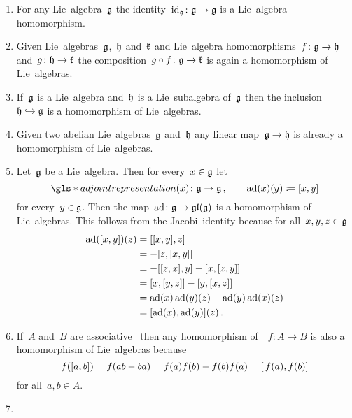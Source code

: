 \begin{examples}
  \label{homomorphisms of lie algebras}
  \leavevmode
  \begin{enumerate}
    \item
      For any Lie~algebra~$\mathfrak{g}$ the identity~$\operatorname{id}_{\mathfrak{g}} \colon \mathfrak{g} \to \mathfrak{g}$ is a Lie~algebra homomorphism.
    \item
      Given Lie~algebras~$\mathfrak{g}$,~$\mathfrak{h}$ and~$\mathfrak{k}$ and Lie~algebra homomorphisms~$f \colon \mathfrak{g} \to \mathfrak{h}$ and~$g \colon \mathfrak{h} \to \mathfrak{k}$ the composition~$g \circ f \colon \mathfrak{g} \to \mathfrak{k}$ is again a homomorphism of Lie~algebras.
    \item
      If~$\mathfrak{g}$ is a Lie~algebra and~$\mathfrak{h}$ is a Lie~subalgebra of~$\mathfrak{g}$ then the inclusion~$\mathfrak{h} \hookrightarrow \mathfrak{g}$ is a homomorphism of Lie~algebras.
    \item
      Given two abelian Lie~algebras~$\mathfrak{g}$ and~$\mathfrak{h}$ any linear map~$\mathfrak{g} \to \mathfrak{h}$ is already a homomorphism of Lie~algebras.
    \item
      Let~$\mathfrak{g}$ be a Lie~algebra.
      Then for every~$x \in \mathfrak{g}$ let
      \[
        \gls*{adjoint representation}(x)
        \colon
        \glie
        \to
        \glie \,,
        \qquad
        \ad(x)(y)
        \defined
        [x,y]
      \]
      for every~$y \in \mathfrak{g}$.
      Then the map~$\operatorname{ad} \colon \mathfrak{g} \to \mathfrak{gl}(\mathfrak{g})$ is a homomorphism of Lie~algebras.
      This follows from the Jacobi~identity because for all~$x,y,z \in \mathfrak{g}$
      \begin{align*}
          \operatorname{ad}([x,y])(z)
          &=
          [[x,y], z]
          \\
          &=
          - [z, [x,y]]
          \\
          &=
          - [[z,x], y] - [x, [z,y]]
          \\
          &=
          [x, [y,z]] - [y, [x,z]]
          \\
          &=
          \operatorname{ad}(x)\operatorname{ad}(y)(z) - \operatorname{ad}(y)\operatorname{ad}(x)(z)
          \\
          &=
          [\operatorname{ad}(x), \operatorname{ad}(y)](z) \,.
      \end{align*}
    \item
    If~$A$ and~$B$ are associative~{\algebras{$\kf$}} then any homomorphism of~{\algebras{$\kf$}}~$f \colon A \to B$ is also a homomorphism of Lie~algebras because
    \[
      f([a,b])
      =
      f(ab - ba)
      =
      f(a)f(b) - f(b)f(a)
      =
      [\, f(a), f(b)]
    \]
    for all~$a, b \in A$.
  \item

\end{enumerate}
\end{examples}
